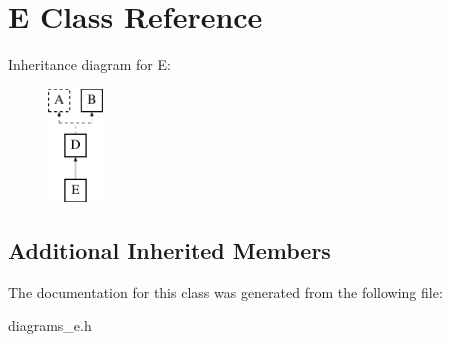 \hypertarget{class_e}{\section{E Class Reference}
\label{class_e}
}
Inheritance diagram for E\-:\begin{figure}[H]
\begin{center}
\leavevmode
\includegraphics[height=3.000000cm]{class_e}
\end{center}
\end{figure}
\subsection*{Additional Inherited Members}


The documentation for this class was generated from the following file\-:\begin{DoxyCompactItemize}
\item 
diagrams\-\_\-e.\-h\end{DoxyCompactItemize}
